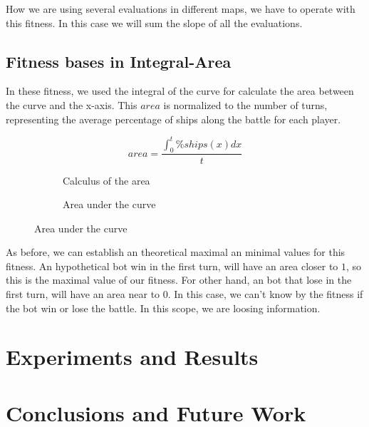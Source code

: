 \documentclass{llncs}
\begin{document}
How we are using several evaluations in different maps, we have to operate with this fitness. In this case we will sum the slope of all the evaluations.

\subsection{Fitness bases in Integral-Area}
\label{sec:fitness}

In these fitness, we used the integral of the curve for calculate the area between the curve and the x-axis. This {$area$} is normalized to the number of turns, representing the average percentage of ships along the battle for each player.

\begin{figure}[h]
\begin{subfigure}[H]{0.4\textwidth}
    \begin{equation}
        area=\frac{\int_{0}^{t}\%ships(x)dx}{t}
    \end{equation}
    \caption{Calculus of the area}
    \label{equation:LeatsSqueares}
\end{subfigure}
\begin{subfigure}[H]{0.8\textwidth}
\begin{center}
\end{center}
\caption{Area under the curve} 
\label{figura:nubecita}
\end{subfigure}
\end{figure}

As before, we can establish an theoretical maximal an minimal values for this fitness. An hypothetical bot win in the first turn, will have an area closer to {$1$}, so this is the maximal value of our fitness. For other hand, an bot that lose in the first turn, will have an area near to {$0$}. In this case, we can't know by the fitness if the bot win or lose the battle. In this scope, we are loosing information.

%
\section{Experiments and Results}
\label{sec:experiments}


%
\section{Conclusions and Future Work}
\label{sec:conclusions}
\end{document}
